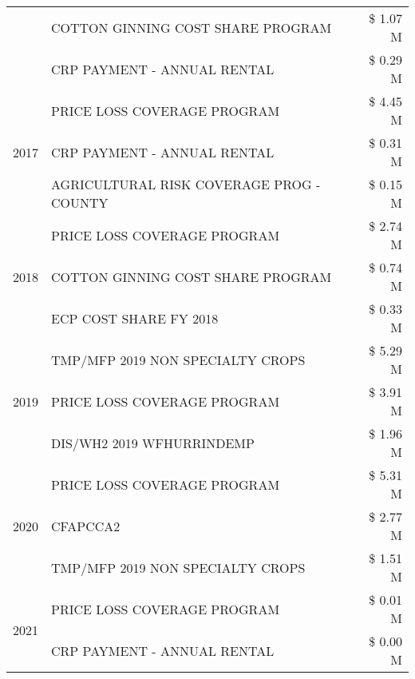 \begin{tabular}{llr}
 & COTTON GINNING COST SHARE PROGRAM             & \$ 1.07 M \\
 & CRP PAYMENT - ANNUAL RENTAL                   & \$ 0.29 M \\
\cline{1-3}
\multirow[t]{3}{*}{2017} & PRICE LOSS COVERAGE PROGRAM & \$ 4.45 M \\
 & CRP PAYMENT - ANNUAL RENTAL & \$ 0.31 M \\
 & AGRICULTURAL RISK COVERAGE PROG - COUNTY & \$ 0.15 M \\
\cline{1-3}
\multirow[t]{3}{*}{2018} & PRICE LOSS COVERAGE PROGRAM & \$ 2.74 M \\
 & COTTON GINNING COST SHARE PROGRAM & \$ 0.74 M \\
 & ECP COST SHARE FY 2018 & \$ 0.33 M \\
\cline{1-3}
\multirow[t]{3}{*}{2019} & TMP/MFP 2019 NON SPECIALTY CROPS & \$ 5.29 M \\
 & PRICE LOSS COVERAGE PROGRAM & \$ 3.91 M \\
 & DIS/WH2 2019 WFHURRINDEMP & \$ 1.96 M \\
\cline{1-3}
\multirow[t]{3}{*}{2020} & PRICE LOSS COVERAGE PROGRAM & \$ 5.31 M \\
 & CFAPCCA2 & \$ 2.77 M \\
 & TMP/MFP 2019 NON SPECIALTY CROPS & \$ 1.51 M \\
\cline{1-3}
\multirow[t]{2}{*}{2021} & PRICE LOSS COVERAGE PROGRAM & \$ 0.01 M \\
 & CRP PAYMENT - ANNUAL RENTAL & \$ 0.00 M \\
\cline{1-3}
\bottomrule
\end{tabular}
